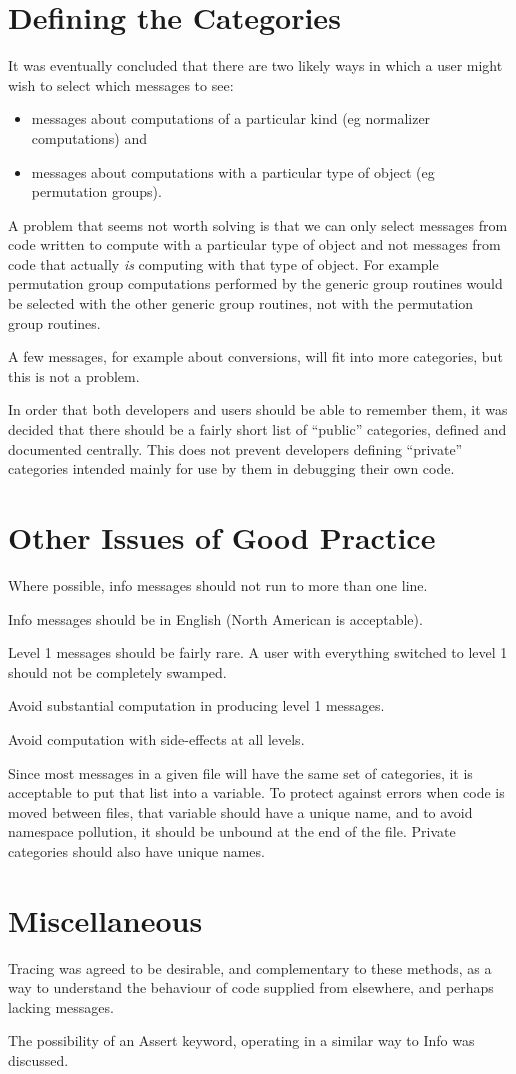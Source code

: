 \documentclass{article}
\begin{document}
\section{Defining the Categories}

It was eventually concluded that there are two likely ways in which a
user might wish to select which messages to see:
\begin{itemize}
\item messages about computations of a particular kind (eg
normalizer computations) and
\item messages about computations with a particular type of object (eg
permutation groups).
\end{itemize}

A problem that seems not worth solving is that we can only select
messages from code written to compute with a particular type of
object and not messages from code that actually \emph{is} computing
with that type of object. For example permutation group computations
performed by the generic group routines would be selected with the
other generic group routines, not with the permutation group routines.

A few messages, for example about conversions, will fit into more
categories, but this is not a problem.

In order that both developers and users should be able to remember
them, it was decided that there should be a fairly short list of
``public'' categories, defined and documented centrally. This does not
prevent developers defining ``private'' categories intended mainly for
use by them in debugging their own code.

\section{Other Issues of Good Practice}

Where possible, info messages should not run to more than one line.
 
Info messages should be in English (North American is acceptable).

Level 1 messages should be fairly rare. A user with everything
switched to level 1 should not be completely swamped. 

Avoid substantial computation in producing level 1 messages.

Avoid computation with side-effects at all levels.

Since most messages in a given file will have the same set of
categories, it is acceptable to put that list into a variable. To
protect against errors when code is moved between files, that variable
should have a unique name, and to avoid namespace pollution, it should
be unbound at the end of the file. Private categories should also have
unique names.

\section{Miscellaneous}

Tracing was agreed to be desirable, and complementary to these
methods, as a way to understand the behaviour of code supplied from
elsewhere, and perhaps lacking messages.

The possibility of an Assert keyword, operating in a similar way to
Info was discussed.
\end{document}
